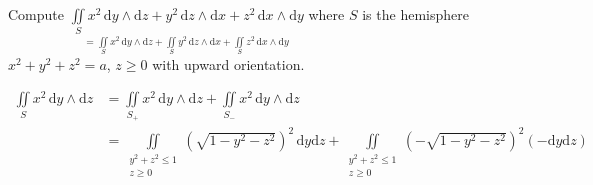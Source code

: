 \begin{example}
    Compute $\underset{=\iint\limits_S x^2\,\mathrm{d}y\wedge\mathrm{d}z+\iint\limits_S y^2\,\mathrm{d}z\wedge\mathrm{d}x+\iint\limits_S z^2\,\mathrm{d}x\wedge\mathrm{d}y}{\iint\limits_S x^2\,\mathrm{d}y\wedge\mathrm{d}z+y^2\,\mathrm{d}z\wedge\mathrm{d}x+z^2\,\mathrm{d}x\wedge\mathrm{d}y}$ where $S$ is the hemisphere $x^2+y^2+z^2=a$, $z\geq 0$ with upward orientation.

    \begin{align*}
        \iint\limits_S x^2\,\mathrm{d}y\wedge\mathrm{d}z
         & =\iint\limits_{S_+}x^2\,\mathrm{d}y\wedge\mathrm{d}z+\iint\limits_{S_-}x^2\,\mathrm{d}y\wedge\mathrm{d}z \\
         & =\iint\limits_{\substack{y^2+z^2\leq 1                                                                   \\z\geq 0}}\left(\sqrt{1-y^2-z^2}\right)^2\,\mathrm{d}y\mathrm{d}z+\iint\limits_{\substack{y^2+z^2\leq 1\\z\geq 0}}\left(-\sqrt{1-y^2-z^2}\right)^2(-\mathrm{d}y\mathrm{d}z) \\
    \end{align*}
\end{example}